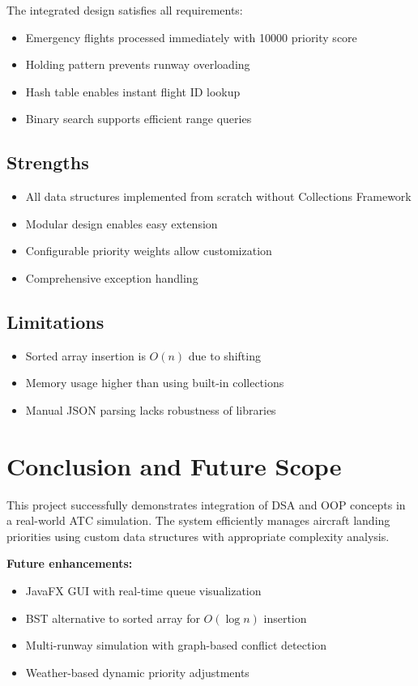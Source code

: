 \documentclass[12pt,a4paper]{article}
\begin{document}
The integrated design satisfies all requirements:
\begin{itemize}
    \item Emergency flights processed immediately with 10000 priority score
    \item Holding pattern prevents runway overloading
    \item Hash table enables instant flight ID lookup
    \item Binary search supports efficient range queries
\end{itemize}

\subsection{Strengths}

\begin{itemize}
    \item All data structures implemented from scratch without Collections Framework
    \item Modular design enables easy extension
    \item Configurable priority weights allow customization
    \item Comprehensive exception handling
\end{itemize}

\subsection{Limitations}

\begin{itemize}
    \item Sorted array insertion is $O(n)$ due to shifting
    \item Memory usage higher than using built-in collections
    \item Manual JSON parsing lacks robustness of libraries
\end{itemize}

\section{Conclusion and Future Scope}

This project successfully demonstrates integration of DSA and OOP concepts in a real-world ATC simulation. The system efficiently manages aircraft landing priorities using custom data structures with appropriate complexity analysis.

\textbf{Future enhancements:}
\begin{itemize}
    \item JavaFX GUI with real-time queue visualization
    \item BST alternative to sorted array for $O(\log n)$ insertion
    \item Multi-runway simulation with graph-based conflict detection
    \item Weather-based dynamic priority adjustments
\end{itemize}
\end{document}
